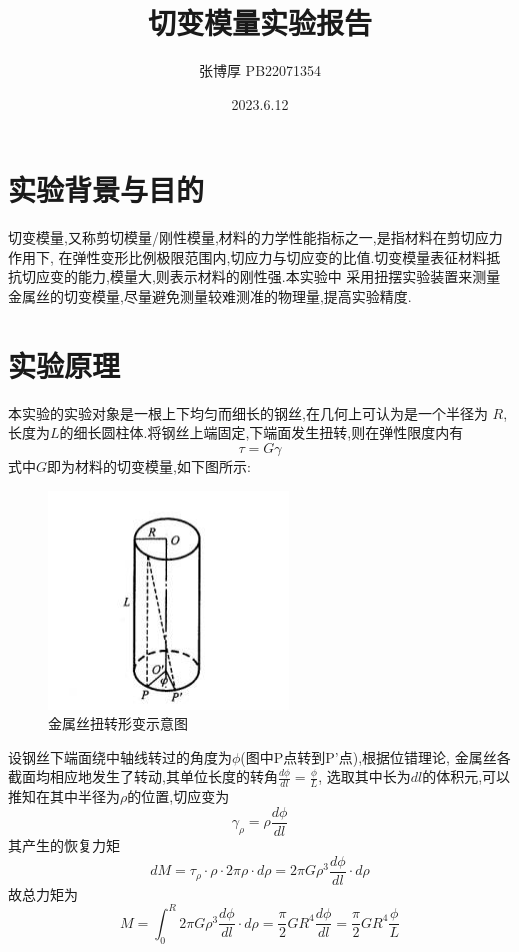 \documentclass[12pt,a4paper,oneside]{ctexart}
\title{切变模量实验报告}
\author{张博厚 PB22071354}
\date{2023.6.12}
\begin{document}
\maketitle
\tableofcontents
\newpage
\section{实验背景与目的}
切变模量,又称剪切模量/刚性模量,材料的力学性能指标之一,是指材料在剪切应力作用下,
在弹性变形比例极限范围内,切应力与切应变的比值.切变模量表征材料抵抗切应变的能力,模量大,则表示材料的刚性强.本实验中
采用扭摆实验装置来测量金属丝的切变模量,尽量避免测量较难测准的物理量,提高实验精度.
\section{实验原理}
本实验的实验对象是一根上下均匀而细长的钢丝,在几何上可认为是一个半径为
$R$,长度为$L$的细长圆柱体.将钢丝上端固定,下端面发生扭转,则在弹性限度内有
\begin{equation}
    \tau = G\gamma
\end{equation}
式中$G$即为材料的切变模量,如下图所示:
\begin{figure}[H]
    \centering
    \includegraphics[scale=1.2]{扭转形变示意图.png}
    \caption{金属丝扭转形变示意图}
\end{figure}
设钢丝下端面绕中轴线转过的角度为$\phi$(图中P点转到P'点),根据位错理论,
金属丝各截面均相应地发生了转动,其单位长度的转角$\frac{d\phi}{dl}=\frac{\phi}{L}$,
选取其中长为$dl$的体积元,可以推知在其中半径为$\rho$的位置,切应变为
\begin{equation}
    \gamma_{\rho}=\rho\dfrac{d\phi}{dl}
\end{equation}
其产生的恢复力矩
\begin{equation}
    dM=\tau_{\rho}\cdot\rho\cdot2\pi\rho\cdot d\rho=2\pi G\rho^3\dfrac{d\phi}{dl}\cdot d\rho
\end{equation}
故总力矩为
\begin{equation}
    M=\int_0^R2\pi G\rho^3\dfrac{d\phi}{dl}\cdot d\rho=\dfrac{\pi}{2}GR^4\dfrac{d\phi}{dl}=\dfrac{\pi}{2}GR^4\dfrac{\phi}{L}
\end{equation}
\end{document}
